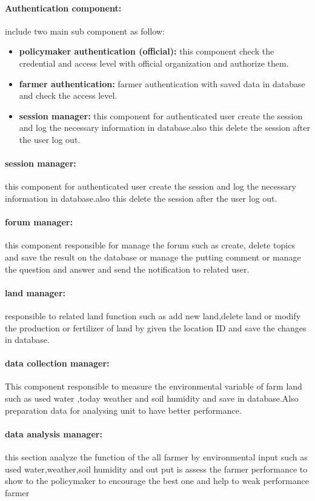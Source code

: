 \paragraph{Authentication component:}include two main sub component as follow:
\begin{itemize}
    \item \textbf{policymaker authentication (official):} this component check the credential and access level  with official organization and authorize them.
    \item \textbf{farmer authentication:} farmer authentication with saved data in database and check the access level.
    \item \textbf{session manager:} this component for authenticated user create the session and log the necessary information in database.also this delete the session after the user log out.
\end{itemize}

\paragraph{session manager:}this component for authenticated user create the session and log the necessary information in database.also this delete the session after the user log out.\newline
\paragraph{forum manager:}this component responsible for manage the forum such as create, delete topics and save the result on the database or manage the putting  comment or manage the question and answer and send the notification to related user.
\paragraph{land manager:}responsible to  related land function such as add new land,delete land or modify the production or fertilizer of land by given the location ID and save the changes in database.
\paragraph{data collection  manager:}This component responsible to  measure the environmental variable of farm land such as used water ,today weather and soil humidity and save in database.Also preparation data for analysing unit to have better performance.
\paragraph{data analysis manager: } this section analyze the function of the all farmer by environmental input such as used water,weather,soil humidity and out put is assess the farmer performance to show to the policymaker to encourage the best one and help to weak performance farmer
